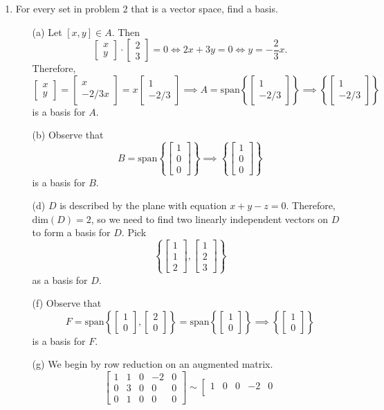 \documentclass[letter]{article}
\newcommand{\Span}{\mathrm{span}}
\newcommand{\Dim}{\mathrm{dim}}
\newcommand{\mat}[1]{\begin{bmatrix}#1\end{bmatrix}}
\newenvironment{answer}{
	\begin{adjustwidth}{8mm}{} \vspace{2mm}}{\end{adjustwidth} \vspace{2mm}
}
\theoremstyle{plain}
\theoremstyle{definition}
\theoremstyle{remark}
\begin{document}
\begin{enumerate}
		\item For every set in problem 2 that is a vector space, find a basis.
		\begin{answer}
			\begin{enumerate}
				\item[(a)] Let $[x,y] \in A$. Then
				\[
				\mat{x\\y} \cdot \mat{2\\3} = 0 \iff 2x + 3y = 0 \iff y = -\frac{2}{3}x.
				\]
				Therefore,
				\[
				\mat{x\\y} = \mat{x\\-2/3 x} = x\mat{1\\-2/3} \implies 
				A = \Span\left\{\mat{1\\-2/3}\right\} \implies
				\left\{\mat{1\\-2/3}\right\}
				\]
				is a basis for $A$. 
				\item[(b)] Observe that
				\[
				B = \Span\left\{\mat{1\\0\\0}\right\} \implies \left\{\mat{1\\0\\0}\right\}
				\]
				is a basis for $B$. 
				\item[(d)] $D$ is described by the plane with equation $x+y-z = 0$. Therefore, $\Dim(D) = 2$, so we need to find two linearly independent vectors on $D$ to form a basis for $D$. Pick
				\[
				\left\{\mat{1\\1\\2}, \mat{1\\2\\3}\right\}
				\]
				as a basis for $D$. 
				\item[(f)] Observe that
				\[
				F = \Span\left\{\mat{1\\0}, \mat{2\\0}\right\} = \Span\left\{\mat{1\\0}\right\} \implies \left\{\mat{1\\0}\right\}
				\]
				is a basis for $F$. 
				\item[(g)] We begin by row reduction on an augmented matrix. 
				\[
				\left[\begin{array}{cccc|c}
					1&1&0&-2&0 \\
					0&3&0&0&0 \\
					0&1&0&0&0
				\end{array}\right] \sim
				\left[\begin{array}{cccc|c}
					1&0&0&-2&0 \\

\end{array}\]
\end{enumerate}
\end{answer}
\end{enumerate}
\end{document}
